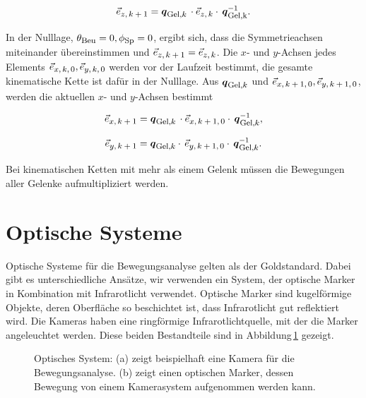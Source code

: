 \begin{equation}
    \vec{e}_{\textrm{\footnotesize{$z,k+1$}}} = \mbox{\boldmath ${q}$}_{\textrm{\footnotesize{Gel,$k$}}}\,\cdot \vec{e}_{\textrm{\footnotesize{$z,k$}}} \cdot \,\mbox{\boldmath ${q}$}_{\textrm{\footnotesize{Gel,k}}}^{-1}.
\end{equation}

In der Nulllage, $\theta_{\textrm{\footnotesize{Beu}}}=0,\phi_{\textrm{\footnotesize{Sp}}}=0$, ergibt sich, dass die Symmetrieachsen miteinander übereinstimmen und $\vec{e}_{\textrm{\footnotesize{$z,k+1$}}} = \vec{e}_{\textrm{\footnotesize{$z,k$}}}$. Die $x$- und $y$-Achsen jedes Elements $\vec{e}_{\textrm{\footnotesize{$x,k,0$}}},\vec{e}_{\textrm{\footnotesize{$y,k,0$}}}$ werden vor der Laufzeit bestimmt, die gesamte kinematische Kette ist dafür in der Nulllage. Aus $\mbox{\boldmath ${q}$}_{\textrm{\footnotesize{Gel,$k$}}}$ und $\vec{e}_{\textrm{\footnotesize{$x,k+1,0$}}},\vec{e}_{\textrm{\footnotesize{$y,k+1,0$}}}$, werden die aktuellen $x$- und $y$-Achsen bestimmt

\begin{equation}
    \vec{e}_{\textrm{\footnotesize{$x,k+1$}}} = \mbox{\boldmath ${q}$}_{\textrm{\footnotesize{Gel,$k$}}}\,\cdot \vec{e}_{\textrm{\footnotesize{$x,k+1,0$}}} \cdot \,\mbox{\boldmath ${q}$}_{\textrm{\footnotesize{Gel,$k$}}}^{-1},
\end{equation}

\begin{equation}
    \vec{e}_{\textrm{\footnotesize{$y,k+1$}}} = \mbox{\boldmath ${q}$}_{\textrm{\footnotesize{Gel,$k$}}}\cdot\, \vec{e}_{\textrm{\footnotesize{$y,k+1,0$}}} \cdot \,\mbox{\boldmath ${q}$}_{\textrm{\footnotesize{Gel,$k$}}}^{-1}.
\end{equation}

Bei kinematischen Ketten mit mehr als einem Gelenk müssen die Bewegungen aller Gelenke aufmultipliziert werden.


\section{Optische Systeme}
\label{sec:ConventionalSystems}

Optische Systeme für die Bewegungsanalyse gelten als der Goldstandard. Dabei gibt es unterschiedliche Ansätze, wir verwenden ein System, der optische Marker in Kombination mit Infrarotlicht verwendet. Optische Marker sind kugelförmige Objekte, deren Oberfläche so beschichtet ist, dass Infrarotlicht gut reflektiert wird. Die Kameras haben eine ringförmige Infrarotlichtquelle, mit der die Marker angeleuchtet werden. Diese beiden Bestandteile sind in Abbildung\,\ref{fig:MaterialOMC} gezeigt.

\begin{figure}[h]
    \centering
    \caption{Optisches System: (a) zeigt beispielhaft eine Kamera für die Bewegungsanalyse. (b) zeigt einen optischen Marker, dessen Bewegung von einem Kamerasystem aufgenommen werden kann.}
    \label{fig:MaterialOMC}
\end{figure}

